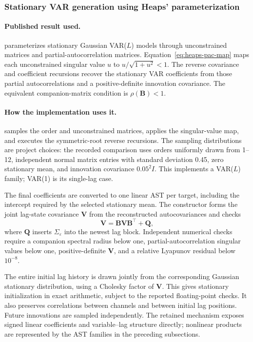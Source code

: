 \subsubsection{Stationary VAR generation using Heaps' parameterization}
\label{sec:implemented-heaps}

\paragraph{Published result used.}
\citet[Sections~2.1--2.2 and Appendix]{heaps2023stationarity} parameterizes
stationary Gaussian VAR($L$) models through unconstrained matrices and
partial-autocorrelation matrices. Equation~\eqref{eq:heaps-pac-map} maps each
unconstrained singular value $u$ to $u/\sqrt{1+u^2}<1$. The reverse covariance
and coefficient recursions recover the stationary VAR coefficients from
those partial autocorrelations and a positive-definite innovation covariance.
The equivalent companion-matrix condition is $\rho(\mathbf B)<1$.

\paragraph{How the implementation uses it.}
 samples the order and unconstrained
matrices, applies the singular-value map, and executes the symmetric-root
reverse recursions. The sampling distributions are project choices: the
recorded comparison uses orders uniformly drawn from 1--12, independent
normal matrix entries with standard deviation 0.45, zero stationary mean,
and innovation covariance $0.05^2 I$. This implements a VAR($L$) family;
VAR(1) is its single-lag case.

The final coefficients are converted to one linear AST per target, including
the intercept required by the selected stationary mean. The constructor
forms the joint lag-state covariance $\mathbf V$ from the reconstructed
autocovariances and checks
\begin{equation}
 \mathbf V=\mathbf B\mathbf V\mathbf B^\top+\mathbf Q,
 \label{eq:implemented-heaps-lyapunov}
\end{equation}
where $\mathbf Q$ inserts $\Sigma_\varepsilon$ into the newest lag block.
Independent numerical checks require a companion spectral radius below one,
partial-autocorrelation singular values below one, positive-definite
$\mathbf V$, and a relative Lyapunov residual below $10^{-8}$.

The entire initial lag history is drawn jointly from the corresponding
Gaussian stationary distribution, using a Cholesky factor of $\mathbf V$.
This gives stationary initialization in exact arithmetic, subject to the
reported floating-point checks. It also preserves correlations between
channels and between initial lag positions. Future innovations are sampled
independently. The retained mechanism exposes signed linear coefficients and
variable--lag structure directly; nonlinear products are represented by the
AST families in the preceding subsections.
